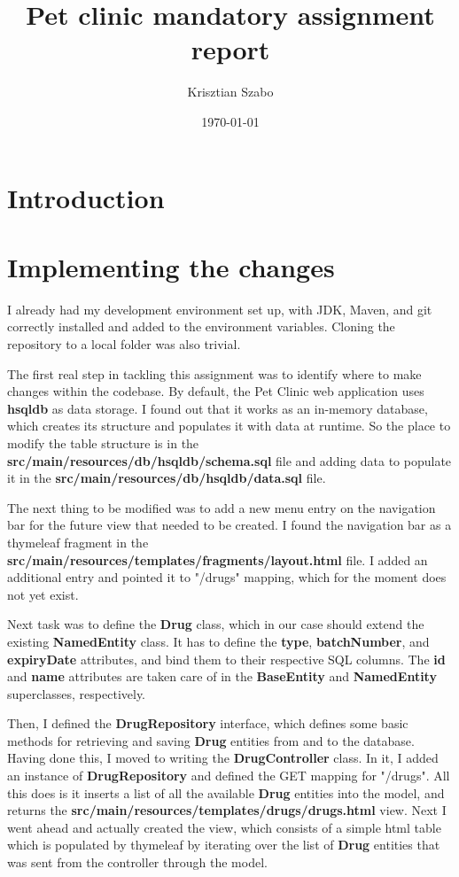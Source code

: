 \documentclass[12pt, a4paper]{article}
\title{Pet clinic mandatory assignment report}
\author{Krisztian Szabo}
\date{\today{}}
\begin{document}
\maketitle
{}
\newpage

\tableofcontents
{}
\newpage

\section{Introduction}


\section{Implementing the changes}
I already had my development environment set up, with JDK, Maven, and git correctly installed and added to the environment variables. Cloning the repository to a local folder was also trivial.

The first real step in tackling this assignment was to identify where to make changes within the codebase. By default, the Pet Clinic web application uses \textbf{hsqldb} as data storage. I found out that it works as an in-memory database, which creates its structure and populates it with data at runtime. So the place to modify the table structure is in the \textbf{src/main/resources/db/hsqldb/schema.sql} file and adding data to populate it in the \textbf{src/main/resources/db/hsqldb/data.sql} file.

The next thing to be modified was to add a new menu entry on the navigation bar for the future view that needed to be created. I found the navigation bar as a thymeleaf fragment in the \textbf{src/main/resources/templates/fragments/layout.html} file. I added an additional entry and pointed it to "/drugs" mapping, which for the moment does not yet exist.

Next task was to define the \textbf{Drug} class, which in our case should extend the existing \textbf{NamedEntity} class. It has to define the \textbf{type}, \textbf{batchNumber}, and \textbf{expiryDate} attributes, and bind them to their respective SQL columns. The \textbf{id} and \textbf{name} attributes are taken care of in the \textbf{BaseEntity} and \textbf{NamedEntity} superclasses, respectively.

Then, I defined the \textbf{DrugRepository} interface, which defines some basic methods for retrieving and saving \textbf{Drug} entities from and to the database. Having done this, I moved to writing the \textbf{DrugController} class. In it, I added an instance of \textbf{DrugRepository} and defined the GET mapping for "/drugs". All this does is it inserts a list of all the available \textbf{Drug} entities into the model, and returns the \textbf{src/main/resources/templates/drugs/drugs.html} view. Next I went ahead and actually created the view, which consists of a simple html table which is populated by thymeleaf by iterating over the list of \textbf{Drug} entities that was sent from the controller through the model.
\end{document}
